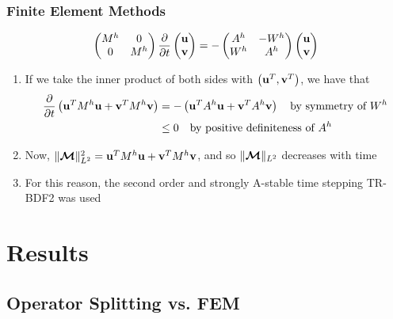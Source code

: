 \begin{frame}
\frametitle{Finite Element Methods}
\vspace{-1cm}
\begin{align*}
    \begin{pmatrix}
    M^h & 0 \\ 
    0 & M^h
    \end{pmatrix}
    \frac{\partial }{\partial t}
    \begin{pmatrix} \mathbf{u} \\ \mathbf{v} \end{pmatrix}
    = -
    \begin{pmatrix}
    A^h & -W^h \\ 
    W^h & A^h
    \end{pmatrix}
    \begin{pmatrix} \mathbf{u} \\ \mathbf{v} \end{pmatrix}
\end{align*}
\begin{enumerate}
    \item If we take the inner product of both sides with $\begin{pmatrix} \mathbf{u}^T, \mathbf{v}^T \end{pmatrix}$, we have that
    \begin{align*}
    \frac{\partial }{\partial t}
    \left( \mathbf{u}^T M^h \mathbf{u} + \mathbf{v}^T M^h \mathbf{v} \right)
    &= - \left( \mathbf{u}^T A^h \mathbf{u} + \mathbf{v}^T A^h \mathbf{v} \right)
    \quad \text{by symmetry of } W^h \\
    &\leq 0 \quad \text{by positive definiteness of } A^h
    \end{align*}
    \item Now, $\lVert \bm{\mathcal{M}} \rVert_{L^2}^2 = \mathbf{u}^T M^h \mathbf{u} + \mathbf{v}^T M^h \mathbf{v}$, and so $\lVert \bm{\mathcal{M}} \rVert_{L^2}$ decreases with time
    \item For this reason, the second order and strongly A-stable time stepping \textsc{TR-BDF2} was used
\end{enumerate}
\end{frame}


\section{Results}

\subsection{Operator Splitting vs. FEM}

